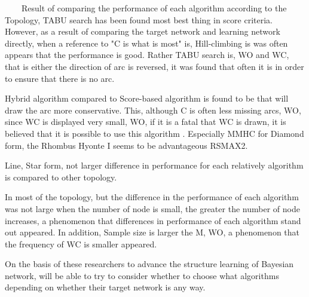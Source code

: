 ~~~~Result of comparing the performance of each algorithm according to the Topology, TABU search has been found most best thing in score criteria. However, as a result of comparing the target network and learning network directly, when a reference to "C is what is most" is, Hill-climbing is was often appears that the performance is good. Rather TABU search is, WO and WC, that is either the direction of arc is reversed, it was found that often it is in order to ensure that there is no arc.

Hybrid algorithm compared to Score-based algorithm is found to be that will draw the arc more conservative. This, although C is often less missing arcs, WO, since WC is displayed very small, WO, if it is a fatal that WC is drawn, it is believed that it is possible to use this algorithm . Especially MMHC for Diamond form, the Rhombus Hyonte I seems to be advantageous RSMAX2.

Line, Star form, not larger difference in performance for each relatively algorithm is compared to other topology.

In most of the topology, but the difference in the performance of each algorithm was not large when the number of node is small, the greater the number of node increases, a phenomenon that differences in performance of each algorithm stand out appeared. In addition, Sample size is larger the M, WO, a phenomenon that the frequency of WC is smaller appeared.

On the basis of these researchers to advance the structure learning of Bayesian network, will be able to try to consider whether to choose what algorithms depending on whether their target network is any way.

